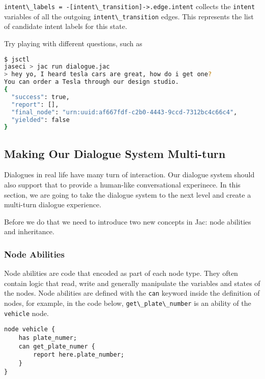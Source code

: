 \passthrough{\lstinline!intent\_labels = -[intent\_transition]->.edge.intent!}
collects the \passthrough{\lstinline!intent!} variables of all the
outgoing \passthrough{\lstinline!intent\_transition!} edges. This
represents the list of candidate intent labels for this state.

Try playing with different questions, such as

\begin{lstlisting}[language=bash]
$ jsctl
jaseci > jac run dialogue.jac
> hey yo, I heard tesla cars are great, how do i get one?
You can order a Tesla through our design studio.
{
  "success": true,
  "report": [],
  "final_node": "urn:uuid:af667fdf-c2b0-4443-9ccd-7312bc4c66c4",
  "yielded": false
}
\end{lstlisting}

\hypertarget{making-our-dialogue-system-multi-turn}{%
\subsection{Making Our Dialogue System
Multi-turn}\label{making-our-dialogue-system-multi-turn}}

Dialogues in real life have many turn of interaction. Our dialogue
system should also support that to provide a human-like conversational
experinece. In this section, we are going to take the dialogue system to
the next level and create a multi-turn dialogue experience.

Before we do that we need to introduce two new concepts in Jac: node
abilities and inheritance.

\hypertarget{node-abilities}{%
\subsubsection{Node Abilities}\label{node-abilities}}

Node abilities are code that encoded as part of each node type. They
often contain logic that read, write and generally manipulate the
variables and states of the nodes. Node abilities are defined with the
\passthrough{\lstinline!can!} keyword inside the definition of nodes,
for example, in the code below,
\passthrough{\lstinline!get\_plate\_number!} is an ability of the
\passthrough{\lstinline!vehicle!} node.

\begin{lstlisting}
node vehicle {
    has plate_numer;
    can get_plate_numer {
        report here.plate_number;
    }
}
\end{lstlisting}

